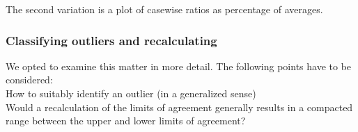 \documentclass[Chap2main.tex]{subfiles}
\begin{document}
The second variation is a plot of casewise ratios as percentage of
averages.


\newpage








\subsubsection{Classifying outliers and recalculating} We opted to
examine this matter in more detail. The following points have to
be considered:
\\
\indent How to suitably identify an outlier (in a generalized sense)
\\
\indent Would a recalculation of the limits of agreement generally
results in  a compacted range between the upper and lower limits
of agreement?
\newpage
\end{document}
